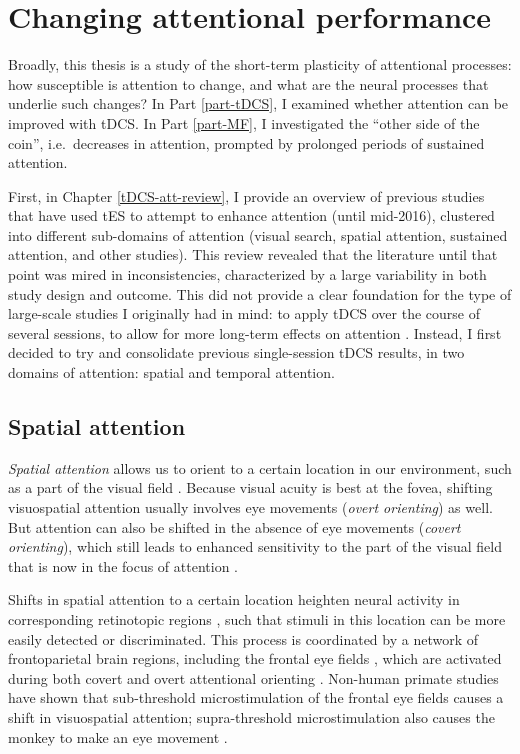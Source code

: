 \documentclass[11pt,english,]{memoir}
\begin{document}
\hypertarget{changing-attentional-performance}{%
\section{Changing attentional performance}\label{changing-attentional-performance}}

Broadly, this thesis is a study of the short-term plasticity of attentional processes: how susceptible is attention to change, and what are the neural processes that underlie such changes? In Part \ref{part-tDCS}, I examined whether attention can be improved with tDCS. In Part \ref{part-MF}, I investigated the ``other side of the coin'', i.e.~decreases in attention, prompted by prolonged periods of sustained attention.

First, in Chapter \ref{tDCS-att-review}, I provide an overview of previous studies that have used tES to attempt to enhance attention (until mid-2016), clustered into different sub-domains of attention (visual search, spatial attention, sustained attention, and other studies). This review revealed that the literature until that point was mired in inconsistencies, characterized by a large variability in both study design and outcome. This did not provide a clear foundation for the type of large-scale studies I originally had in mind: to apply tDCS over the course of several sessions, to allow for more long-term effects on attention \autocite[c.f.][]{Talsma2017}. Instead, I first decided to try and consolidate previous single-session tDCS results, in two domains of attention: spatial and temporal attention.

\hypertarget{spatial-attention}{%
\subsection{Spatial attention}\label{spatial-attention}}

\emph{Spatial attention} allows us to orient to a certain location in our environment, such as a part of the visual field \autocite{Wright2008}. Because visual acuity is best at the fovea, shifting visuospatial attention usually involves eye movements (\emph{overt orienting}) as well. But attention can also be shifted in the absence of eye movements (\emph{covert orienting}), which still leads to enhanced sensitivity to the part of the visual field that is now in the focus of attention \autocite{Carrasco2011}.

Shifts in spatial attention to a certain location heighten neural activity in corresponding retinotopic regions \autocites{Desimone1995}{Tootell1998}{Ungerleider1999}{Worden2000}, such that stimuli in this location can be more easily detected or discriminated. This process is coordinated by a network of frontoparietal brain regions, including the frontal eye fields \autocite{Corbetta2002}, which are activated during both covert and overt attentional orienting \autocites{Grosbras2005}{Nobre2000}. Non-human primate studies have shown that sub-threshold microstimulation of the frontal eye fields causes a shift in visuospatial attention; supra-threshold microstimulation also causes the monkey to make an eye movement \autocite{Moore2001}.
\end{document}
